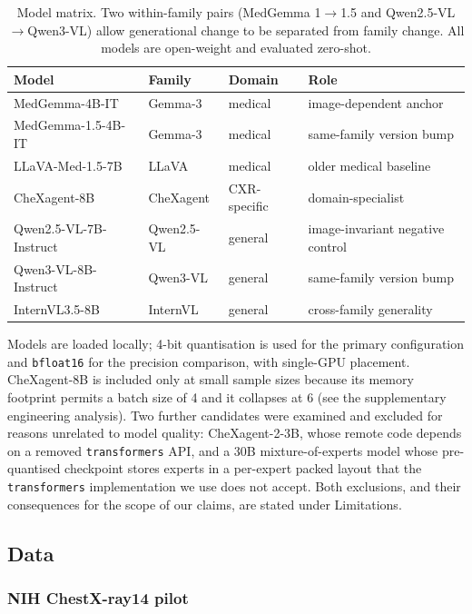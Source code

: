 \begin{table}[t]
\centering
\small
\begin{tabular}{llll}
\hline
Model & Family & Domain & Role \\
\hline
MedGemma-4B-IT & Gemma-3 & medical & image-dependent anchor \\
MedGemma-1.5-4B-IT & Gemma-3 & medical & same-family version bump \\
LLaVA-Med-1.5-7B & LLaVA & medical & older medical baseline \\
CheXagent-8B & CheXagent & CXR-specific & domain-specialist \\
Qwen2.5-VL-7B-Instruct & Qwen2.5-VL & general & image-invariant negative control \\
Qwen3-VL-8B-Instruct & Qwen3-VL & general & same-family version bump \\
InternVL3.5-8B & InternVL & general & cross-family generality \\
\hline
\end{tabular}
\caption{Model matrix. Two within-family pairs (MedGemma 1$\rightarrow$1.5 and
Qwen2.5-VL$\rightarrow$Qwen3-VL) allow generational change to be separated from
family change. All models are open-weight and evaluated zero-shot.}
\label{tab:models}
\end{table}

Models are loaded locally; 4-bit quantisation is used for the primary
configuration and \texttt{bfloat16} for the precision comparison, with
single-GPU placement. CheXagent-8B is included only at small sample sizes
because its memory footprint permits a batch size of 4 and it collapses at 6
(see the supplementary engineering analysis). Two further candidates were
examined and excluded for reasons unrelated to model quality: CheXagent-2-3B,
whose remote code depends on a removed \texttt{transformers} API, and a 30B
mixture-of-experts model whose pre-quantised checkpoint stores experts in a
per-expert packed layout that the \texttt{transformers} implementation we use
does not accept. Both exclusions, and their consequences for the scope of our
claims, are stated under Limitations.

\subsection{Data}

\subsubsection{NIH ChestX-ray14 pilot}

